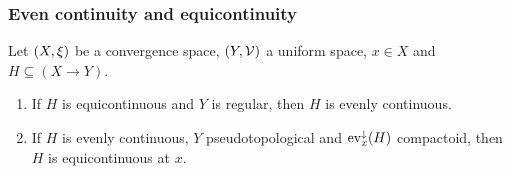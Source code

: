 \subsubsection{Even continuity and equicontinuity}
\begin{proposition} \label{equicontinuityEvenContinuity}
Let $\sSet{X,\xi}$ be a convergence space, $\sSet{Y, \mathcal{V}}$ a uniform space, $x\in X$ and $H \subseteq (X\to Y)$.
\begin{enumerate}
\item If $H$ is equicontinuous and $Y$ is regular, then $H$ is evenly continuous.
\item If $H$ is evenly continuous, $Y$ pseudotopological and $\operatorname{ev}_x^\downarrow(H)$ compactoid, then $H$ is equicontinuous at $x$.
\end{enumerate}
\end{proposition}
